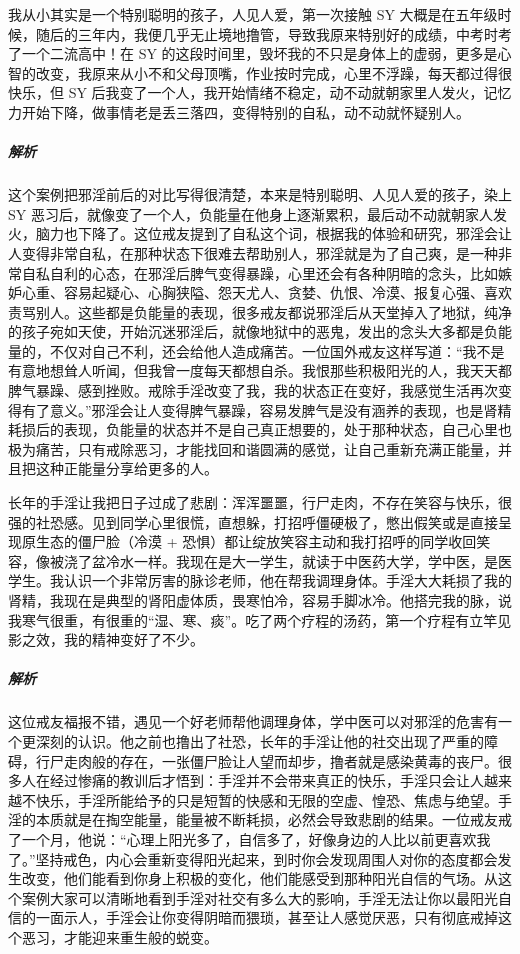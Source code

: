 \begin{case}
    我从小其实是一个特别聪明的孩子，人见人爱，第一次接触 SY 大概是在五年级时候，随后的三年内，我便几乎无止境地撸管，导致我原来特别好的成绩，中考时考了一个二流高中！在 SY 的这段时间里，毁坏我的不只是身体上的虚弱，更多是心智的改变，我原来从小不和父母顶嘴，作业按时完成，心里不浮躁，每天都过得很快乐，但 SY 后我变了一个人，我开始情绪不稳定，动不动就朝家里人发火，记忆力开始下降，做事情老是丢三落四，变得特别的自私，动不动就怀疑别人。
    \subparagraph{解析} 这个案例把邪淫前后的对比写得很清楚，本来是特别聪明、人见人爱的孩子，染上 SY 恶习后，就像变了一个人，负能量在他身上逐渐累积，最后动不动就朝家人发火，脑力也下降了。这位戒友提到了自私这个词，根据我的体验和研究，邪淫会让人变得非常自私，在那种状态下很难去帮助别人，邪淫就是为了自己爽，是一种非常自私自利的心态，在邪淫后脾气变得暴躁，心里还会有各种阴暗的念头，比如嫉妒心重、容易起疑心、心胸狭隘、怨天尤人、贪婪、仇恨、冷漠、报复心强、喜欢责骂别人。这些都是负能量的表现，很多戒友都说邪淫后从天堂掉入了地狱，纯净的孩子宛如天使，开始沉迷邪淫后，就像地狱中的恶鬼，发出的念头大多都是负能量的，不仅对自己不利，还会给他人造成痛苦。一位国外戒友这样写道：“我不是有意地想耸人听闻，但我曾一度每天都想自杀。我恨那些积极阳光的人，我天天都脾气暴躁、感到挫败。戒除手淫改变了我，我的状态正在变好，我感觉生活再次变得有了意义。”邪淫会让人变得脾气暴躁，容易发脾气是没有涵养的表现，也是肾精耗损后的表现，负能量的状态并不是自己真正想要的，处于那种状态，自己心里也极为痛苦，只有戒除恶习，才能找回和谐圆满的感觉，让自己重新充满正能量，并且把这种正能量分享给更多的人。
\end{case}

\begin{case}
    长年的手淫让我把日子过成了悲剧：浑浑噩噩，行尸走肉，不存在笑容与快乐，很强的社恐感。见到同学心里很慌，直想躲，打招呼僵硬极了，憋出假笑或是直接呈现原生态的僵尸脸（冷漠 + 恐惧）都让绽放笑容主动和我打招呼的同学收回笑容，像被浇了盆冷水一样。我现在是大一学生，就读于中医药大学，学中医，是医学生。我认识一个非常厉害的脉诊老师，他在帮我调理身体。手淫大大耗损了我的肾精，我现在是典型的肾阳虚体质，畏寒怕冷，容易手脚冰冷。他搭完我的脉，说我寒气很重，有很重的“湿、寒、痰”。吃了两个疗程的汤药，第一个疗程有立竿见影之效，我的精神变好了不少。
    \subparagraph{解析} 这位戒友福报不错，遇见一个好老师帮他调理身体，学中医可以对邪淫的危害有一个更深刻的认识。他之前也撸出了社恐，长年的手淫让他的社交出现了严重的障碍，行尸走肉般的存在，一张僵尸脸让人望而却步，撸者就是感染黄毒的丧尸。很多人在经过惨痛的教训后才悟到：手淫并不会带来真正的快乐，手淫只会让人越来越不快乐，手淫所能给予的只是短暂的快感和无限的空虚、惶恐、焦虑与绝望。手淫的本质就是在掏空能量，能量被不断耗损，必然会导致悲剧的结果。一位戒友戒了一个月，他说：“心理上阳光多了，自信多了，好像身边的人比以前更喜欢我了。”坚持戒色，内心会重新变得阳光起来，到时你会发现周围人对你的态度都会发生改变，他们能看到你身上积极的变化，他们能感受到那种阳光自信的气场。从这个案例大家可以清晰地看到手淫对社交有多么大的影响，手淫无法让你以最阳光自信的一面示人，手淫会让你变得阴暗而猥琐，甚至让人感觉厌恶，只有彻底戒掉这个恶习，才能迎来重生般的蜕变。
\end{case}

